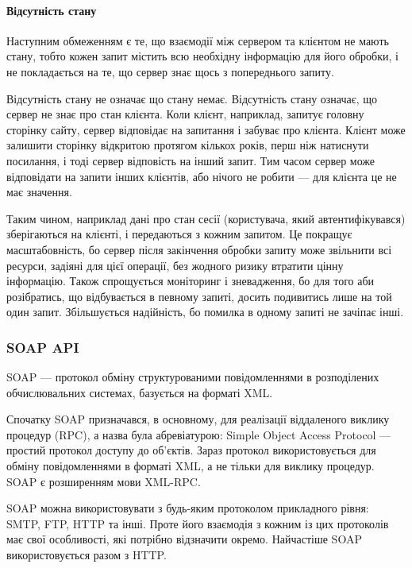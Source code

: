 \paragraph{Відсутність стану}

Наступним обмеженням є те, що взаємодії між сервером та клієнтом не мають стану, тобто кожен запит містить всю необхідну інформацію для його обробки, і не покладається на те, що сервер знає щось з попереднього запиту.

Відсутність стану не означає що стану немає. Відсутність стану означає, що сервер не знає про стан клієнта. Коли клієнт, наприклад, запитує головну сторінку сайту, сервер відповідає на запитання і забуває про клієнта. Клієнт може залишити сторінку відкритою протягом кількох років, перш ніж натиснути посилання, і тоді сервер відповість на інший запит. Тим часом сервер може відповідати на запити інших клієнтів, або нічого не робити — для клієнта це не має значення.

Таким чином, наприклад дані про стан сесії (користувача, який автентифікувався) зберігаються на клієнті, і передаються з кожним запитом. Це покращує масштабовність, бо сервер після закінчення обробки запиту може звільнити всі ресурси, задіяні для цієї операції, без жодного ризику втратити цінну інформацію. Також спрощується моніторинг і зневадження, бо для того аби розібратись, що відбувається в певному запиті, досить подивитись лише на той один запит. Збільшується надійність, бо помилка в одному запиті не зачіпає інші.

\subsubsection{SOAP API}

SOAP — протокол обміну структурованими повідомленнями в розподілених обчислювальних системах, базується на форматі XML.

Спочатку SOAP призначався, в основному, для реалізації віддаленого виклику процедур (RPC), а назва була абревіатурою: Simple Object Access Protocol — простий протокол доступу до об'єктів. Зараз протокол використовується для обміну повідомленнями в форматі XML, а не тільки для виклику процедур. SOAP є розширенням мови XML-RPC.

SOAP можна використовувати з будь-яким протоколом прикладного рівня: SMTP, FTP, HTTP та інші. Проте його взаємодія з кожним із цих протоколів має свої особливості, які потрібно відзначити окремо. Найчастіше SOAP використовується разом з HTTP.

